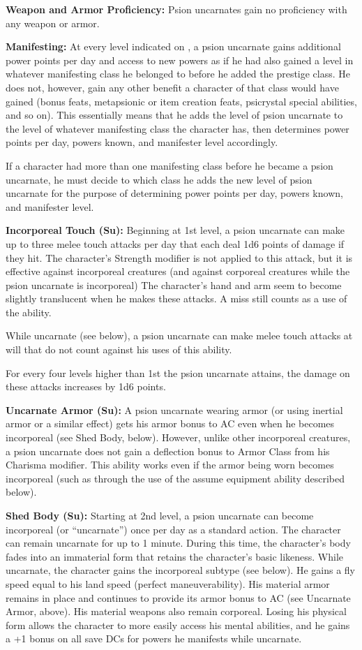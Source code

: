 {
\textbf{Weapon and Armor Proficiency:} Psion uncarnates gain no proficiency with any weapon or armor.

\textbf{Manifesting:} At every level indicated on , a psion uncarnate gains additional power points per day and access to new powers as if he had also gained a level in whatever manifesting class he belonged to before he added the prestige class. He does not, however, gain any other benefit a character of that class would have gained (bonus feats, metapsionic or item creation feats, psicrystal special abilities, and so on). This essentially means that he adds the level of psion uncarnate to the level of whatever manifesting class the character has, then determines power points per day, powers known, and manifester level accordingly.

If a character had more than one manifesting class before he became a psion uncarnate, he must decide to which class he adds the new level of psion uncarnate for the purpose of determining power points per day, powers known, and manifester level.

\textbf{Incorporeal Touch (Su):} Beginning at 1st level, a psion uncarnate can make up to three melee touch attacks per day that each deal 1d6 points of damage if they hit. The character's Strength modifier is not applied to this attack, but it is effective against incorporeal creatures (and against corporeal creatures while the psion uncarnate is incorporeal) The character's hand and arm seem to become slightly translucent when he makes these attacks. A miss still counts as a use of the ability.

While uncarnate (see below), a psion uncarnate can make melee touch attacks at will that do not count against his uses of this ability.

For every four levels higher than 1st the psion uncarnate attains, the damage on these attacks increases by 1d6 points.

\textbf{Uncarnate Armor (Su):} A psion uncarnate wearing armor (or using inertial armor or a similar effect) gets his armor bonus to AC even when he becomes incorporeal (see Shed Body, below). However, unlike other incorporeal creatures, a psion uncarnate does not gain a deflection bonus to Armor Class from his Charisma modifier. This ability works even if the armor being worn becomes incorporeal (such as through the use of the assume equipment ability described below).

\textbf{Shed Body (Su):} Starting at 2nd level, a psion uncarnate can become incorporeal (or ``uncarnate'') once per day as a standard action. The character can remain uncarnate for up to 1 minute. During this time, the character's body fades into an immaterial form that retains the character's basic likeness. While uncarnate, the character gains the incorporeal subtype (see below). He gains a fly speed equal to his land speed (perfect maneuverability). His material armor remains in place and continues to provide its armor bonus to AC (see Uncarnate Armor, above). His material weapons also remain corporeal. Losing his physical form allows the character to more easily access his mental abilities, and he gains a +1 bonus on all save DCs for powers he manifests while uncarnate.

}
